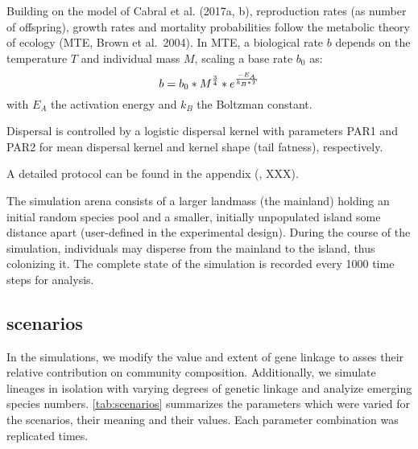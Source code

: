 \documentclass[a4paper]{scrartcl}
\begin{document}
Building on the model of Cabral et al. (2017a, b), reproduction rates (as number of offspring),
growth rates and mortality probabilities follow the metabolic theory
of ecology (MTE, Brown et al.\ 2004). %
In MTE, a biological rate $b$ depends on the temperature $T$ and individual mass $M$, scaling a base rate $b_0$ as:
\begin{equation}
  b=b_0*M^{3\over4}*e^{-{E_A}\over{k_B*T}}
  \label{eq:MTE}
\end{equation}
with $E_A$ the activation energy and $k_B$ the Boltzman constant.

Dispersal is controlled by a logistic dispersal kernel \cite{bullockjamesm.SynthesisEmpiricalPlant2016}
with parameters PAR1 and PAR2
for mean dispersal kernel and kernel shape (tail fatness), respectively.

A detailed protocol can be found in the appendix (\cite{grimm2010odd}, XXX).



The simulation arena consists of a larger landmass (the mainland) holding an initial random species pool and a smaller,
initially unpopulated island some distance apart (user-defined in the experimental design).
During the course of the simulation, individuals may disperse from the mainland to the island, thus colonizing it. 
The complete state of the simulation is recorded every 1000 time steps for analysis.

\subsection{scenarios}
In the simulations, we modify the value and extent of
gene linkage
to asses their relative contribution on community composition.
Additionally, we simulate lineages in isolation with varying degrees of genetic linkage
and analyize emerging species numbers.
\cref{tab:scenarios} summarizes the parameters which were varied for the scenarios, their meaning and their values. %
Each parameter combination was replicated %
times.%
\end{document}
